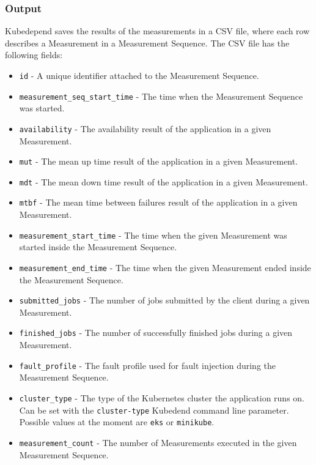 \subsubsection{Output} \label{test-impl-kubedepend-output}

Kubedepend saves the results of the measurements in a CSV file, where each row describes a Measurement in a Measurement Sequence. The CSV file has the following fields:

\begin{itemize}
	\item \texttt{id} - A unique identifier attached to the Measurement Sequence.
	\item \texttt{measurement\_seq\_start\_time} - The time when the Measurement Sequence was started.
	\item \texttt{availability} - The availability result of the application in a given Measurement.
	\item \texttt{mut} - The mean up time result of the application in a given Measurement.
	\item \texttt{mdt} - The mean down time result of the application in a given Measurement.
	\item \texttt{mtbf} - The mean time between failures result of the application in a given Measurement.
	\item \texttt{measurement\_start\_time} - The time when the given Measurement was started inside the Measurement Sequence.
	\item \texttt{measurement\_end\_time} - The time when the given Measurement ended inside the Measurement Sequence.
	\item \texttt{submitted\_jobs} - The number of jobs submitted by the client during a given Measurement.
	\item \texttt{finished\_jobs} - The number of successfully finished jobs during a given Measurement.
	\item \texttt{fault\_profile} - The fault profile used for fault injection during the Measurement Sequence.
	\item \texttt{cluster\_type} - The type of the Kubernetes cluster the application runs on. Can be set with the \texttt{cluster-type} Kubedend command line parameter. Possible values at the moment are \texttt{eks} or \texttt{minikube}.
	\item \texttt{measurement\_count} - The number of Measurements executed in the given Measurement Sequence.

\end{itemize}
